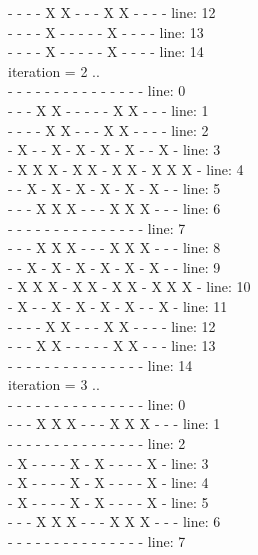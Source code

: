 \documentclass[a4paper, 14pt]{article}
\begin{document}
\begin{enumerate}
{ -  -  -  -  X  X  -  -  -  X  X  -  -  -  - 	line: 12\\
 -  -  -  -  X  -  -  -  -  -  X  -  -  -  - 	line: 13\\
 -  -  -  -  X  -  -  -  -  -  X  -  -  -  - 	line: 14\\
\newpage
iteration = 2 ..\\
 -  -  -  -  -  -  -  -  -  -  -  -  -  -  - 	line: 0\\
 -  -  -  X  X  -  -  -  -  -  X  X  -  -  - 	line: 1\\
 -  -  -  -  X  X  -  -  -  X  X  -  -  -  - 	line: 2\\
 -  X  -  -  X  -  X  -  X  -  X  -  -  X  - 	line: 3\\
 -  X  X  X  -  X  X  -  X  X  -  X  X  X  - 	line: 4\\
 -  -  X  -  X  -  X  -  X  -  X  -  X  -  - 	line: 5\\
 -  -  -  X  X  X  -  -  -  X  X  X  -  -  - 	line: 6\\
 -  -  -  -  -  -  -  -  -  -  -  -  -  -  - 	line: 7\\
 -  -  -  X  X  X  -  -  -  X  X  X  -  -  - 	line: 8\\
 -  -  X  -  X  -  X  -  X  -  X  -  X  -  - 	line: 9\\
 -  X  X  X  -  X  X  -  X  X  -  X  X  X  - 	line: 10\\
 -  X  -  -  X  -  X  -  X  -  X  -  -  X  - 	line: 11\\
 -  -  -  -  X  X  -  -  -  X  X  -  -  -  - 	line: 12\\
 -  -  -  X  X  -  -  -  -  -  X  X  -  -  - 	line: 13\\
 -  -  -  -  -  -  -  -  -  -  -  -  -  -  - 	line: 14\\
iteration = 3 ..\\
 -  -  -  -  -  -  -  -  -  -  -  -  -  -  - 	line: 0\\
 -  -  -  X  X  X  -  -  -  X  X  X  -  -  - 	line: 1\\
 -  -  -  -  -  -  -  -  -  -  -  -  -  -  - 	line: 2\\
 -  X  -  -  -  -  X  -  X  -  -  -  -  X  - 	line: 3\\
 -  X  -  -  -  -  X  -  X  -  -  -  -  X  - 	line: 4\\
 -  X  -  -  -  -  X  -  X  -  -  -  -  X  - 	line: 5\\
 -  -  -  X  X  X  -  -  -  X  X  X  -  -  - 	line: 6\\
 -  -  -  -  -  -  -  -  -  -  -  -  -  -  - 	line: 7\\
}
\end{enumerate}
\end{document}
